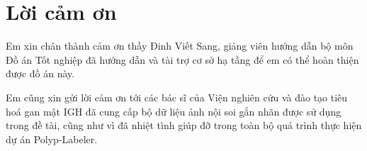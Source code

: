 \documentclass[12pt]{extreport}
\begin{document}








\chapter*{Lời cảm ơn}

Em xin chân thành cảm ơn thầy Đinh Viết Sang, giảng viên hướng dẫn bộ môn Đồ án Tốt nghiệp đã hướng dẫn và tài trợ cơ sở hạ tầng để em có thể hoàn thiện được đồ án này.

Em cũng xin gửi lời cảm ơn tới các bác sĩ của Viện nghiên cứu và đào tạo tiêu hoá gan mật IGH đã cung cấp bộ dữ liệu ảnh nội soi gắn nhãn được sử dụng trong đề tài, cũng như vì đã nhiệt tình giúp đỡ trong toàn bộ quá trình thực hiện dự án Polyp-Labeler.

\tableofcontents
\end{document}
